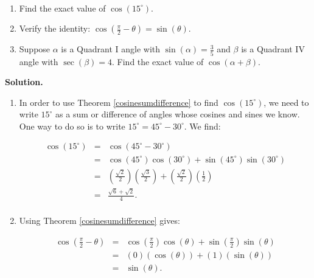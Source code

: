 \documentclass{ximera}
\begin{document}
\begin{example} \label{cosinesumdiffex}  $~$

\begin{enumerate}

\item Find the exact value of $\cos\left(15^{\circ}\right)$.

\item  Verify the identity:  $\cos\left(\frac{\pi}{2} - \theta\right) = \sin(\theta)$.

\item  Suppose $\alpha$ is a Quadrant I angle with $\sin(\alpha) = \frac{3}{5}$ and $\beta$ is a Quadrant IV angle with $\sec(\beta) = 4$.  Find the exact value of $\cos(\alpha + \beta)$.


\end{enumerate}

{\bf Solution.}

\begin{enumerate}

\item In order to use Theorem \ref{cosinesumdifference} to find $\cos\left(15^{\circ}\right)$, we need to write $15^{\circ}$ as a sum or difference of angles whose cosines and sines we know.  One way to do so is to write $15^{\circ} = 45^{\circ} - 30^{\circ}$.  We find:

\[ \begin{array}{rcl}

\cos\left(15^{\circ}\right) & = & \cos\left(45^{\circ} - 30^{\circ} \right) \\  
                            & = & \cos\left(45^{\circ}\right)\cos\left(30^{\circ} \right) + \sin\left(45^{\circ}\right)\sin\left(30^{\circ} \right) \\  
                            & = & \left(  \frac{\sqrt{2}}{2} \right)\left(  \frac{\sqrt{3}}{2} \right)  +  \left(  \frac{\sqrt{2}}{2} \right)\left(  \frac{1}{2} \right)\\  
														& = &   \frac{\sqrt{6}+ \sqrt{2}}{4}. \\ 
\end{array} \]


\item Using Theorem \ref{cosinesumdifference} gives:

\[ \begin{array}{rcl}

\cos\left( \frac{\pi}{2} - \theta\right) & = & \cos\left( \frac{\pi}{2}\right)\cos\left(\theta\right) + \sin\left( \frac{\pi}{2}\right)\sin\left(\theta \right) \\  
                            & = & \left( 0 \right)\left( \cos(\theta) \right)  +  \left( 1 \right)\left( \sin(\theta) \right) \\  
														& = & \sin(\theta) .   \\
\end{array} \]


\end{enumerate}
\end{example}
\end{document}
